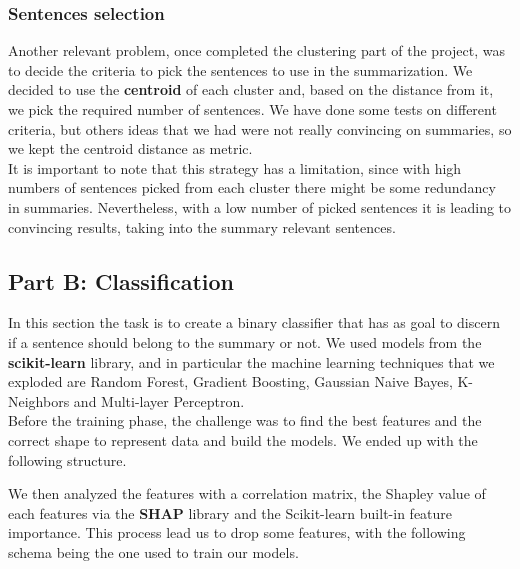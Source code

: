 \subsubsection*{Sentences selection}
Another relevant problem, once completed the clustering part of the project, was to decide the criteria to pick the sentences to use in the summarization. We decided to use the \textbf{centroid} of each cluster and, based on the distance from it, we pick the required number of sentences. We have done some tests on different criteria, but others ideas that we had were not really convincing on summaries, so we kept the centroid distance as metric.\\ It is important to note that this strategy has a limitation, since with high numbers of sentences picked from each cluster there might be some redundancy in summaries. Nevertheless, with a low number of picked sentences it is leading to convincing results, taking into the summary relevant sentences.
\subsection*{Part B: Classification}
In this section the task is to create a binary classifier that has as goal to discern if a sentence should belong to the summary or not. We used models from the \textbf{scikit-learn} library, and in particular the machine learning techniques that we exploded are Random Forest, Gradient Boosting, Gaussian Naive Bayes, K-Neighbors and Multi-layer Perceptron. \\
Before the training phase, the challenge was to find the best features and the correct shape to represent data and build the models. We ended up with the following structure.\\ 
\begin{table}[H]
    \end{table}
We then analyzed the features with a correlation matrix, the Shapley value of each features via the \textbf{SHAP} library and the Scikit-learn built-in feature importance. This process lead us to drop some features, with the following schema being the one used to train our models. 
    
